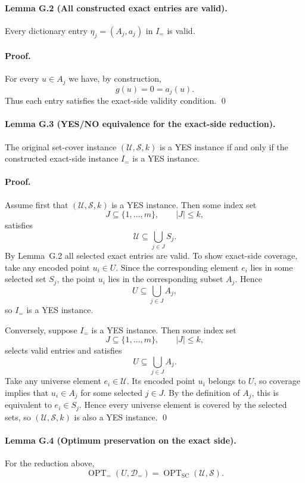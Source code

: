 \paragraph{Lemma G.2 (All constructed exact entries are valid).}
Every dictionary entry $\eta_j=(A_j,a_j)$ in $I_{=}$ is valid.

\paragraph{Proof.}
For every $u\in A_j$ we have, by construction,
\[
g(u)=0=a_j(u).
\]
Thus each entry satisfies the exact-side validity condition. \qed

\paragraph{Lemma G.3 (YES/NO equivalence for the exact-side reduction).}
The original set-cover instance $(\mathcal U,\mathcal S,k)$ is a YES instance if and only if the constructed exact-side instance $I_{=}$ is a YES instance.

\paragraph{Proof.}
Assume first that $(\mathcal U,\mathcal S,k)$ is a YES instance. Then some index set
\[
J\subseteq \{1,\dots,m\},
\qquad |J|\le k,
\]
satisfies
\[
\mathcal U\subseteq \bigcup_{j\in J} S_j.
\]
By Lemma~G.2 all selected exact entries are valid. To show exact-side coverage, take any encoded point $u_i\in U$. Since the corresponding element $e_i$ lies in some selected set $S_j$, the point $u_i$ lies in the corresponding subset $A_j$. Hence
\[
U\subseteq \bigcup_{j\in J} A_j,
\]
so $I_{=}$ is a YES instance.

Conversely, suppose $I_{=}$ is a YES instance. Then some index set
\[
J\subseteq \{1,\dots,m\},
\qquad |J|\le k,
\]
selects valid entries and satisfies
\[
U\subseteq \bigcup_{j\in J} A_j.
\]
Take any universe element $e_i\in\mathcal U$. Its encoded point $u_i$ belongs to $U$, so coverage implies that $u_i\in A_j$ for some selected $j\in J$. By the definition of $A_j$, this is equivalent to $e_i\in S_j$. Hence every universe element is covered by the selected sets, so $(\mathcal U,\mathcal S,k)$ is also a YES instance. \qed

\paragraph{Lemma G.4 (Optimum preservation on the exact side).}
For the reduction above,
\[
\operatorname{OPT}_{=}(U,\mathcal D_{=})
=
\operatorname{OPT}_{\mathrm{SC}}(\mathcal U,\mathcal S).
\]

